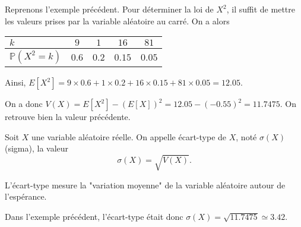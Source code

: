 \documentclass[11pt,fleqn, openany]{book} %
\begin{document}
\begin{example}
Reprenons l'exemple précédent. Pour déterminer la loi de $X^2$, il suffit de mettre les valeurs prises par la variable aléatoire au carré. On a alors

\renewcommand{\arraystretch}{2.2}
\begin{center}
\begin{tabular}{|l|c|c|c|c|}
\hline
$k$ & $9$& $1$ & $16$ & $81$ \\
\hline
$\mathbb{P}(X^2=k)$ & $0.6$ & $0.2$ & $0.15$ & $0.05$\\
\hline \end{tabular}
\end{center}

Ainsi, $E[X^2]=9 \times 0.6 +1 \times 0.2+16 \times 0.15+81 \times 0.05=12.05$.

On a donc $V(X)=E[X^2]-(E[X])^2=12.05-(-0.55)^2=11.7475$. On retrouve bien la valeur précédente.

\end{example}

\begin{definition} Soit $X$ une variable aléatoire réelle. On appelle écart-type de $X$, noté $\sigma(X)$ (sigma), la valeur
\[ \sigma (X)= \sqrt{V(X)}.\]\end{definition}

L'écart-type mesure la "variation moyenne" de la variable aléatoire autour de l'espérance.

\begin{example}Dans l'exemple précédent, l'écart-type était donc $\sigma(X)=\sqrt{11.7475}\simeq 3.42$.\end{example}
\end{document}
